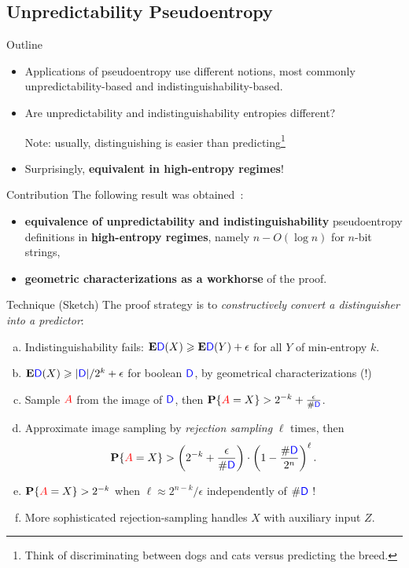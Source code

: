 \documentclass[9pt]{beamer}					%
\begin{document}
\subsection{Unpredictability Pseudoentropy }

\begin{frame}{Outline}
\begin{itemize}
\item[\emoji{open-book}] Applications of pseudoentropy use different notions, most commonly unpredictability-based and indistinguishability-based.
\item[\emoji{question}] Are unpredictability and indistinguishability entropies different? 

Note: usually, distinguishing is easier than predicting\footnote{Think of discriminating between dogs and cats versus predicting the breed.}
\item[\emoji{raised-hand}] Surprisingly, \textbf{equivalent in high-entropy regimes}!
\end{itemize}
\end{frame}

\begin{frame}{Contribution}
The following result was obtained~\cite{DBLP:conf/icalp/SkorskiGP15}:
\begin{itemize}
    \item[\emoji{key}] \textbf{equivalence of unpredictability and indistinguishability} pseudoentropy definitions in \textbf{high-entropy regimes}, namely $n-O(\log n)$ for $n$-bit strings,
    \item[\emoji{key}] \textbf{geometric characterizations as a workhorse} of the proof.
\end{itemize}
\end{frame}

\begin{frame}{Technique (Sketch)}
The proof strategy is to \emph{constructively convert a distinguisher into a predictor}:
\newcommand{\D}{\textcolor{blue}{\mathsf{D}}}
\begin{enumerate}[(a)]
    \item Indistinguishability fails: $\mathbf{E}\D(X)\geqslant \mathbf{E}\D(Y)+\epsilon$ for all $Y$ of min-entropy $k$.
    \item $\mathbf{E}\D(X)\geqslant |\D|/2^{k}+\epsilon$ for boolean $\D$, by geometrical characterizations (!)
    \item Sample $\textcolor{red}{A}$ from the image of $\D$, then $\mathbf{P}\{\textcolor{red}{A} = X\} > 2^{-k}+\frac{\epsilon}{\#\D}$.
    \item Approximate image sampling by \emph{rejection sampling} $\ell$ times, then
    $$\mathbf{P}\{\textcolor{red}{A} = X\} > \left( 2^{-k}+\frac{\epsilon}{\#\D} \right)\cdot \left(1-\frac{\# \D}{2^n}\right)^{\ell}.$$
    \item $\mathbf{P}\{\textcolor{red}{A} = X\} > 2^{-k}$  when $\ell \approx 2^{n-k}/\epsilon$ independently of $\# \D$ !
    \item[\emoji{warning}] More sophisticated rejection-sampling handles $X$ with auxiliary input $Z$.
\end{enumerate}
\end{frame}
\end{document}
